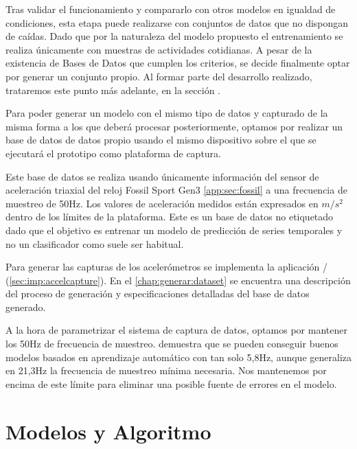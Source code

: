 Tras validar el funcionamiento y compararlo con otros modelos en igualdad de condiciones, esta etapa puede realizarse con conjuntos de datos que no dispongan de caídas. Dado que por la naturaleza del modelo propuesto el entrenamiento se realiza únicamente con muestras de actividades cotidianas. A pesar de la existencia de Bases de Datos que cumplen los criterios, se decide finalmente optar por generar un conjunto propio. Al formar parte del desarrollo realizado, trataremos este punto más adelante, en la sección .




Para poder generar un modelo con el mismo tipo de datos y capturado de la misma forma a los que deberá procesar posteriormente, optamos por realizar un base de datos de datos propio usando el mismo dispositivo sobre el que se ejecutará el prototipo como plataforma de captura.

Este base de datos se realiza usando únicamente información del sensor de aceleración triaxial del reloj Fossil Sport Gen3 \ref{app:sec:fossil} a una frecuencia de muestreo de 50Hz. Los valores de aceleración medidos están expresados en $m/s^2$ dentro de los límites de la plataforma. Este es un base de datos no etiquetado dado que el objetivo es entrenar un modelo de predicción de series temporales y no un clasificador como suele ser habitual.

Para generar las capturas de los acelerómetros se implementa la aplicación \accelcapture/ (\autoref{sec:imp:accelcapture}). En el  \autoref{chap:generar:dataset} se encuentra una descripción del proceso de generación y especificaciones detalladas del base de datos generado.

A la hora de parametrizar el sistema de captura de datos, optamos por mantener los 50Hz de frecuencia de muestreo. \cite{Liu2018} demuestra que se pueden conseguir buenos modelos basados en aprendizaje automático con tan solo 5,8Hz, aunque generaliza en 21,3Hz la frecuencia de muestreo mínima necesaria. Nos mantenemos por encima de este límite para eliminar una posible fuente de errores en el modelo.





\section{Modelos y Algoritmo}\label{sec:req:modelos}

